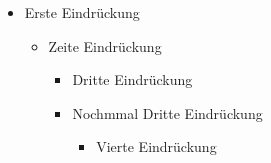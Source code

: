 \documentclass{scrartcl}
\begin{document}
\begin{itemize}
\item Erste Eindrückung
\begin{itemize}
\item Zeite Eindrückung
\begin{itemize}
\item Dritte Eindrückung
\item Nochmmal Dritte Eindrückung
\begin{itemize}
\item Vierte Eindrückung
\end{itemize}
\end{itemize}
\end{itemize}
\end{itemize}
\end{document}
